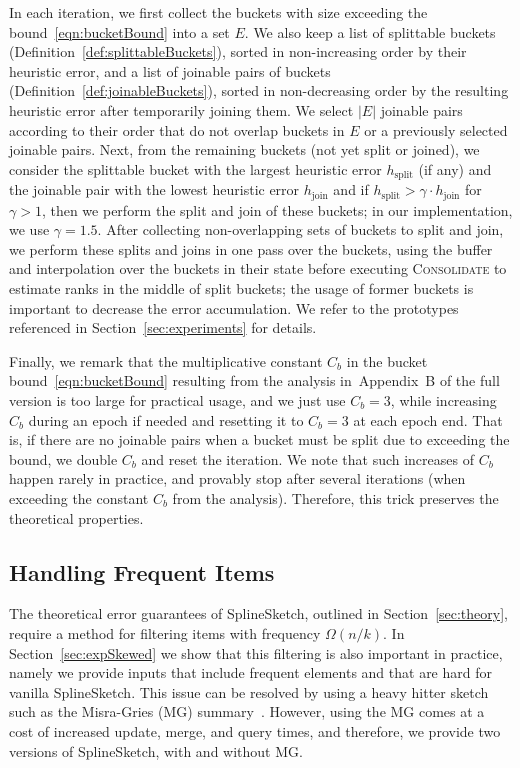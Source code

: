 \documentclass[acmsmall]{acmart}
\newcommand{\consolidate}{\textsc{Consolidate}\xspace}
\theoremstyle{remark}
\begin{document}
In each iteration, we first collect the buckets with size exceeding the bound~\eqref{eqn:bucketBound} into a set $E$.
We also keep a list of splittable buckets (Definition~\ref{def:splittableBuckets}), sorted in non-increasing order by their heuristic error,
and a list of joinable pairs of buckets (Definition~\ref{def:joinableBuckets}), sorted in non-decreasing order by the resulting heuristic error after temporarily joining them.
We select $|E|$ joinable pairs according to their order that do not overlap buckets in $E$ or a previously selected joinable pairs.
Next, from the remaining buckets (not yet split or joined), we consider the splittable bucket with the largest heuristic error $h_{\mathrm{split}}$ (if any)
and the joinable pair with the lowest heuristic error $h_{\mathrm{join}}$ and if $h_{\mathrm{split}} > \gamma\cdot h_{\mathrm{join}}$ for $\gamma > 1$,
then we perform the split and join of these buckets;
in our implementation, we use $\gamma = 1.5$.
After collecting non-overlapping sets of buckets to split and join, we perform these splits and joins
in one pass over the buckets, using the buffer and interpolation over the buckets in their state before executing \consolidate
to estimate ranks in the middle of split buckets;
the usage of former buckets is important to decrease the error accumulation.
We refer to the prototypes referenced in Section~\ref{sec:experiments} for details.

Finally,
we remark that the multiplicative constant $C_b$ in the bucket bound~\eqref{eqn:bucketBound} resulting from the analysis in~Appendix~B of the full version is too large for practical usage,
and we just use $C_b = 3$, while increasing $C_b$ during an epoch if needed and resetting it to $C_b = 3$ at each epoch end. That is, if there are no joinable pairs when a bucket must be split due to exceeding the bound, we double $C_b$ and reset the iteration.
We note that such increases of $C_b$ happen rarely in practice, and provably stop after several iterations (when exceeding the constant $C_b$ from the analysis).
Therefore, this trick preserves the theoretical properties.





\subsection{Handling Frequent Items}
\label{sec:highFrequencyItems-Impl}

The theoretical error guarantees of SplineSketch, outlined in Section~\ref{sec:theory}, require 
a method for filtering items with frequency $\Omega(n/k)$.
In Section~\ref{sec:expSkewed} we show that this filtering is also important in practice, namely we provide inputs that include frequent elements and that are hard for vanilla SplineSketch.
This issue can be resolved by using a heavy hitter sketch such as the Misra-Gries (MG) summary~\cite{misra1982finding}.
However, using the MG comes at a cost of increased update, merge, and query times,
and therefore, we provide two versions of SplineSketch, with and without MG.
\end{document}
